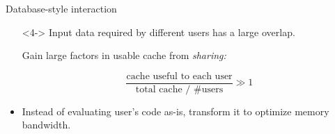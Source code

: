 \documentclass{beamer}
\begin{document}
\begin{frame}{Database-style interaction}
\begin{itemize}
\begin{uncoverenv}<4->
Input data required by different users has a large overlap.

Gain large factors in usable cache from {\it sharing:}

\vspace{-0.15 cm}
\[ \frac{\mbox{cache useful to each user}}{\mbox{total cache / \#users}} \gg 1 \]
\end{uncoverenv}

\item<5-> Instead of evaluating user's code as-is, transform it to optimize memory bandwidth.
\end{itemize}
\end{frame}
\end{document}
